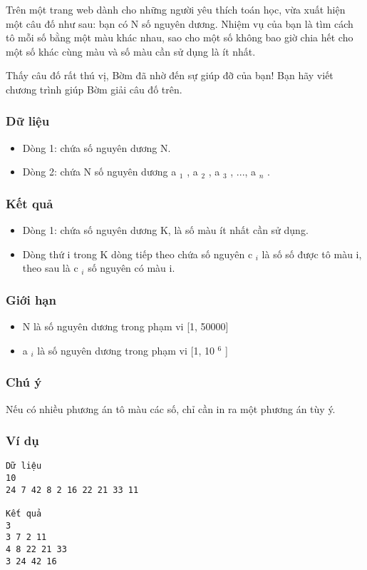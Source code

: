 



   Trên một trang web dành cho những người yêu thích toán học, vừa xuất hiện một câu đố như sau: bạn có N số nguyên dương. Nhiệm vụ của bạn là tìm cách tô mỗi số bằng một màu khác nhau, sao cho một số không bao giờ chia hết cho một số khác cùng màu và số màu cần sử dụng là ít nhất.  

   Thấy câu đố rất thú vị, Bờm đã nhờ đến sự giúp đỡ của bạn! Bạn hãy viết chương trình giúp Bờm giải câu đố trên.  

\subsubsection{   Dữ liệu  }
\begin{itemize}
	\item     Dòng 1: chứa số nguyên dương N.   
	\item     Dòng 2: chứa N số nguyên dương a    $_     1    $    , a    $_     2    $    , a    $_     3    $    , ..., a    $_     n    $    .   
\end{itemize}

\subsubsection{   Kết quả  }
\begin{itemize}
	\item     Dòng 1: chứa số nguyên dương K, là số màu ít nhất cần sử dụng.   
	\item     Dòng thứ i trong K dòng tiếp theo chứa số nguyên c    $_     i    $    là số số được tô màu i, theo sau là c    $_     i    $    số nguyên có màu i.   
\end{itemize}

\subsubsection{   Giới hạn  }
\begin{itemize}
	\item     N là số nguyên dương trong phạm vi [1, 50000]   
	\item     a    $_     i    $    là số nguyên dương trong phạm vi [1, 10    $^     6    $    ]   
\end{itemize}

\subsubsection{   Chú ý  }

   Nếu có nhiều phương án tô màu các số, chỉ cần in ra một phương án tùy ý.  

\subsubsection{   Ví dụ  }
\begin{verbatim}
Dữ liệu
10
24 7 42 8 2 16 22 21 33 11	

Kết quả
3
3 7 2 11 
4 8 22 21 33 
3 24 42 16
\end{verbatim}